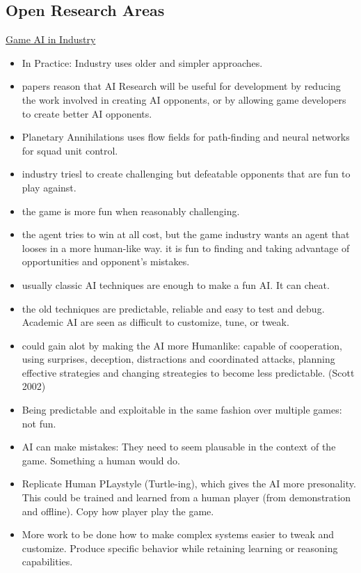 \subsection{Open Research Areas}
\underline{Game AI in Industry}
\begin{itemize}[noitemsep,nolistsep]
	\item In Practice: Industry uses older and simpler approaches.
	\item papers reason that AI Research will be useful for development by reducing the work involved in creating AI opponents, or by allowing game developers to create better AI opponents.
	\item Planetary Annihilations uses flow fields for path-finding and neural networks for squad unit control.
	\item industry triesl to create challenging but defeatable opponents that are fun to play against.
	\item the game is more fun when reasonably challenging.
	\item the agent tries to win at all cost, but the game industry wants an agent that looses in a more human-like way. it is fun to finding and taking advantage of opportunities and opponent's mistakes.
	\item usually classic AI techniques are enough to make a fun AI. It can cheat.
	\item the old techniques are predictable, reliable and easy to test and debug. Academic AI are seen as difficult to customize, tune, or tweak.
	\item could gain alot by making the AI more Humanlike: capable of cooperation, using surprises, deception, distractions and coordinated attacks, planning effective strategies and changing streategies to become less predictable. (Scott 2002)
	\item Being predictable and exploitable in the same fashion over multiple games: not fun.
	\item AI can make mistakes: They need to seem plausable in the context of the game. Something a human would do.
	\item Replicate Human PLaystyle (Turtle-ing), which gives the AI more presonality. This could be trained and learned from a human player (from demonstration and offline). Copy how player play the game.
	\item More work to be done how to make complex systems easier to tweak and customize. Produce specific behavior while retaining learning or reasoning capabilities.
\end{itemize}

